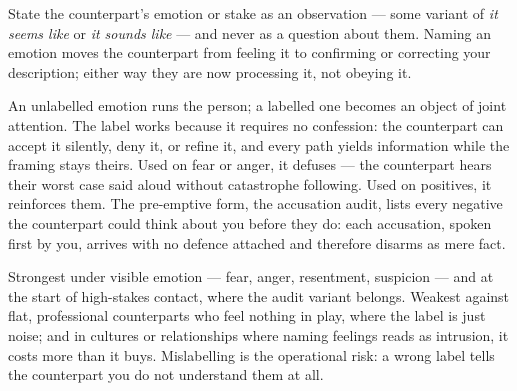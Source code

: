 

\begin{core}
State the counterpart's emotion or stake as an observation --- some variant of \emph{it seems like} or \emph{it sounds like} --- and never as a question about them. Naming an emotion moves the counterpart from feeling it to confirming or correcting your description; either way they are now processing it, not obeying it.
\end{core}
\begin{mechanism}
An unlabelled emotion runs the person; a labelled one becomes an object of joint attention. The label works because it requires no confession: the counterpart can accept it silently, deny it, or refine it, and every path yields information while the framing stays theirs. Used on fear or anger, it defuses --- the counterpart hears their worst case said aloud without catastrophe following. Used on positives, it reinforces them. The pre-emptive form, the accusation audit, lists every negative the counterpart could think about you before they do: each accusation, spoken first by you, arrives with no defence attached and therefore disarms as mere fact.
\end{mechanism}
\begin{conditions}
Strongest under visible emotion --- fear, anger, resentment, suspicion --- and at the start of high-stakes contact, where the audit variant belongs. Weakest against flat, professional counterparts who feel nothing in play, where the label is just noise; and in cultures or relationships where naming feelings reads as intrusion, it costs more than it buys. Mislabelling is the operational risk: a wrong label tells the counterpart you do not understand them at all.
\end{conditions}
